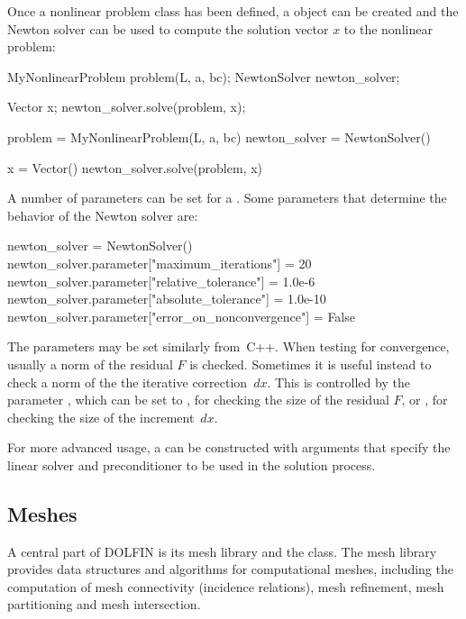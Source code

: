 Once a nonlinear problem class has been defined, a 
object can be created and the Newton solver can be used to compute
the solution vector $x$ to the nonlinear problem:
\begin{c++}
MyNonlinearProblem problem(L, a, bc);
NewtonSolver newton_solver;

Vector x;
newton_solver.solve(problem, x);
\end{c++}
\begin{python}
problem = MyNonlinearProblem(L, a, bc)
newton_solver = NewtonSolver()

x = Vector()
newton_solver.solve(problem, x)
\end{python}
A number of parameters can be set for a . Some
parameters that determine the behavior of the Newton solver are:
\begin{python}
newton_solver = NewtonSolver()
newton_solver.parameter["maximum_iterations"] = 20
newton_solver.parameter["relative_tolerance"] = 1.0e-6
newton_solver.parameter["absolute_tolerance"] = 1.0e-10
newton_solver.parameter["error_on_nonconvergence"] = False
\end{python}
The parameters may be set similarly from~C++.  When testing for
convergence, usually a norm of the residual $F$ is checked.  Sometimes it
is useful instead to check a norm of the the iterative correction~$dx$.
This is controlled by the parameter , which
can be set to , for checking the size of the residual $F$,
or , for checking the size of the increment~$dx$.

For more advanced usage, a  can be constructed with
arguments that specify the linear solver and preconditioner to be used
in the solution process.


\subsection{Meshes}

A central part of DOLFIN is its mesh library and the 
class. The mesh library provides data structures and algorithms for
computational meshes, including the computation of mesh connectivity
(incidence relations), mesh refinement, mesh partitioning and mesh
intersection.

